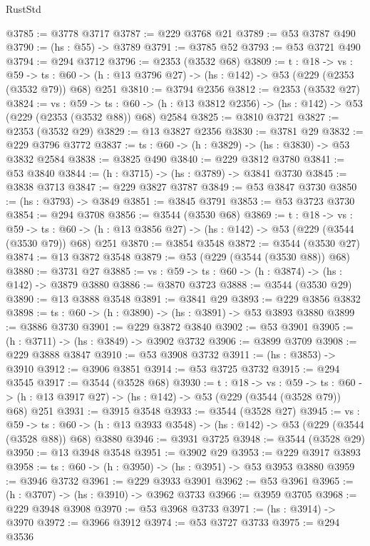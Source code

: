 \begin{lexlean}{RustStd}
\begin{coremodule}
@3785 := @3778 @3717
@3787 := @229 @3768 @21
@3789 := @53 @3787 @490
@3790 := (hs : @55) -> @3789
@3791 := @3785 @52
@3793 := @53 @3721 @490
@3794 := @294 @3712
@3796 := @2353 (@3532 @68)
@3809 := {t : @18} ->
  {vs : @59} ->
  {ts : @60} -> (h : @13 @3796 @27) -> (hs : @142) -> @53 (@229 (@2353 (@3532 @79)) @68) @251
@3810 := @3794 @2356
@3812 := @2353 (@3532 @27)
@3824 := {vs : @59} ->
  {ts : @60} -> (h : @13 @3812 @2356) -> (hs : @142) -> @53 (@229 (@2353 (@3532 @88)) @68) @2584
@3825 := @3810 @3721
@3827 := @2353 (@3532 @29)
@3829 := @13 @3827 @2356
@3830 := @3781 @29
@3832 := @229 @3796 @3772
@3837 := {ts : @60} -> (h : @3829) -> (hs : @3830) -> @53 @3832 @2584
@3838 := @3825 @490
@3840 := @229 @3812 @3780
@3841 := @53 @3840
@3844 := (h : @3715) -> (hs : @3789) -> @3841 @3730
@3845 := @3838 @3713
@3847 := @229 @3827 @3787
@3849 := @53 @3847 @3730
@3850 := (hs : @3793) -> @3849
@3851 := @3845 @3791
@3853 := @53 @3723 @3730
@3854 := @294 @3708
@3856 := @3544 (@3530 @68)
@3869 := {t : @18} ->
  {vs : @59} ->
  {ts : @60} -> (h : @13 @3856 @27) -> (hs : @142) -> @53 (@229 (@3544 (@3530 @79)) @68) @251
@3870 := @3854 @3548
@3872 := @3544 (@3530 @27)
@3874 := @13 @3872 @3548
@3879 := @53 (@229 (@3544 (@3530 @88)) @68)
@3880 := @3731 @27
@3885 := {vs : @59} -> {ts : @60} -> (h : @3874) -> (hs : @142) -> @3879 @3880
@3886 := @3870 @3723
@3888 := @3544 (@3530 @29)
@3890 := @13 @3888 @3548
@3891 := @3841 @29
@3893 := @229 @3856 @3832
@3898 := {ts : @60} -> (h : @3890) -> (hs : @3891) -> @53 @3893 @3880
@3899 := @3886 @3730
@3901 := @229 @3872 @3840
@3902 := @53 @3901
@3905 := (h : @3711) -> (hs : @3849) -> @3902 @3732
@3906 := @3899 @3709
@3908 := @229 @3888 @3847
@3910 := @53 @3908 @3732
@3911 := (hs : @3853) -> @3910
@3912 := @3906 @3851
@3914 := @53 @3725 @3732
@3915 := @294 @3545
@3917 := @3544 (@3528 @68)
@3930 := {t : @18} ->
  {vs : @59} ->
  {ts : @60} -> (h : @13 @3917 @27) -> (hs : @142) -> @53 (@229 (@3544 (@3528 @79)) @68) @251
@3931 := @3915 @3548
@3933 := @3544 (@3528 @27)
@3945 := {vs : @59} ->
  {ts : @60} -> (h : @13 @3933 @3548) -> (hs : @142) -> @53 (@229 (@3544 (@3528 @88)) @68) @3880
@3946 := @3931 @3725
@3948 := @3544 (@3528 @29)
@3950 := @13 @3948 @3548
@3951 := @3902 @29
@3953 := @229 @3917 @3893
@3958 := {ts : @60} -> (h : @3950) -> (hs : @3951) -> @53 @3953 @3880
@3959 := @3946 @3732
@3961 := @229 @3933 @3901
@3962 := @53 @3961
@3965 := (h : @3707) -> (hs : @3910) -> @3962 @3733
@3966 := @3959 @3705
@3968 := @229 @3948 @3908
@3970 := @53 @3968 @3733
@3971 := (hs : @3914) -> @3970
@3972 := @3966 @3912
@3974 := @53 @3727 @3733
@3975 := @294 @3536

\end{coremodule}
\end{lexlean}
